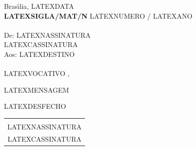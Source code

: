 \documentclass[12pt]{artigo_novo}
\begin{document}
\setlength{\baselineskip}{8mm} 

\vdois
\timbrado

\noindent
\hfill Bras\'{\i}lia, LATEXDATA
\vspace*{5mm} \\
{\bf LATEXSIGLA/MAT/N\primo} LATEXNUMERO / LATEXANO \\
\vspace*{5mm} \\
De:  LATEXNASSINATURA \\
\hdez 
{\small LATEXCASSINATURA}
\\
Aos: LATEXDESTINO
\\ 
\vspace*{10mm} \\

LATEXVOCATIVO ,

\bigskip

LATEXMENSAGEM
\vspace*{1.5cm}

\hspace*{5cm}
\begin{minipage}{9cm}
\begin{center}
LATEXDESFECHO\,
\vspace*{1.5cm} 
\\
\begin{tabular}{c}
\hline \vspace*{-5mm} \\
LATEXNASSINATURA \\
{\small LATEXCASSINATURA}
\end{tabular}
\\
\end{center} 
\end{minipage}
\end{document}

